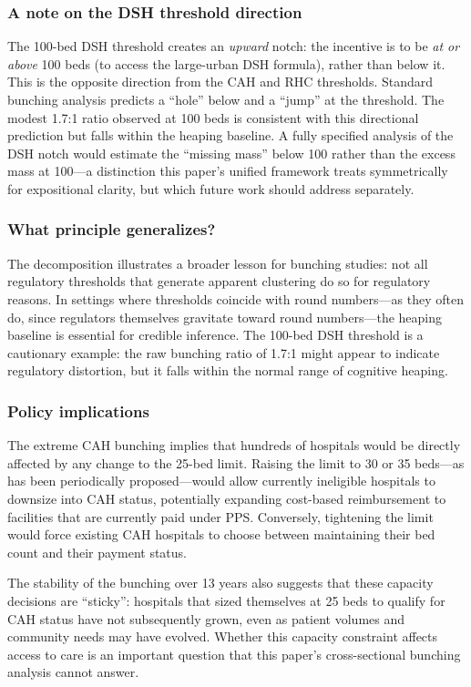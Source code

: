 \documentclass[12pt]{article}
\begin{document}
\subsubsection*{A note on the DSH threshold direction}  The 100-bed DSH threshold creates an \textit{upward} notch: the incentive is to be \textit{at or above} 100 beds (to access the large-urban DSH formula), rather than below it. This is the opposite direction from the CAH and RHC thresholds. Standard bunching analysis predicts a ``hole'' below and a ``jump'' at the threshold. The modest 1.7:1 ratio observed at 100 beds is consistent with this directional prediction but falls within the heaping baseline. A fully specified analysis of the DSH notch would estimate the ``missing mass'' below 100 rather than the excess mass at 100---a distinction this paper's unified framework treats symmetrically for expositional clarity, but which future work should address separately.

\subsubsection*{What principle generalizes?}  The decomposition illustrates a broader lesson for bunching studies: not all regulatory thresholds that generate apparent clustering do so for regulatory reasons. In settings where thresholds coincide with round numbers---as they often do, since regulators themselves gravitate toward round numbers---the heaping baseline is essential for credible inference. The 100-bed DSH threshold is a cautionary example: the raw bunching ratio of 1.7:1 might appear to indicate regulatory distortion, but it falls within the normal range of cognitive heaping.

\subsubsection*{Policy implications}  The extreme CAH bunching implies that hundreds of hospitals would be directly affected by any change to the 25-bed limit. Raising the limit to 30 or 35 beds---as has been periodically proposed---would allow currently ineligible hospitals to downsize into CAH status, potentially expanding cost-based reimbursement to facilities that are currently paid under PPS. Conversely, tightening the limit would force existing CAH hospitals to choose between maintaining their bed count and their payment status.

The stability of the bunching over 13 years also suggests that these capacity decisions are ``sticky'': hospitals that sized themselves at 25 beds to qualify for CAH status have not subsequently grown, even as patient volumes and community needs may have evolved. Whether this capacity constraint affects access to care is an important question that this paper's cross-sectional bunching analysis cannot answer.
\end{document}
